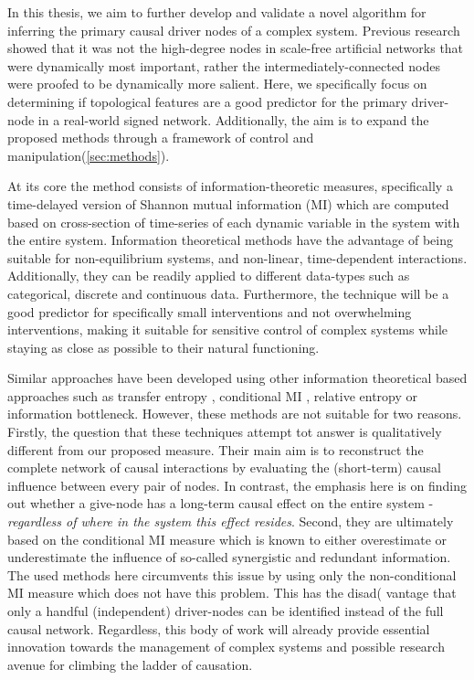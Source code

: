 \documentclass[twoside, twocolumn]{article}
\begin{document}
	In this thesis, we aim to further develop and validate a novel algorithm for inferring the primary causal driver nodes of a complex system\cite{Quax2013}. Previous research showed that it was not the high-degree nodes in scale-free artificial networks that were dynamically most important, rather the intermediately-connected nodes were proofed to be dynamically more salient. Here, we specifically focus on determining if topological features are a good predictor for the primary driver-node in a real-world signed network.  Additionally, the aim is to expand the proposed methods through a framework of control and manipulation(\ref{sec:methods}).

	At its core the method consists of information-theoretic measures, specifically a time-delayed version of Shannon mutual information (MI)\cite{Cover2005} which are computed based on cross-section of time-series of each dynamic variable in the system with the entire system. Information theoretical methods have the advantage of being suitable for non-equilibrium systems, and non-linear,  time-dependent interactions. Additionally, they can be readily applied to different data-types such as categorical, discrete and continuous data. Furthermore, the technique will be a good predictor for specifically small interventions and not overwhelming interventions, making it suitable for sensitive control of complex systems while staying as close as possible to their natural functioning.

	Similar approaches have been developed using other information theoretical based approaches such as transfer entropy \cite{Eichler2006}, conditional MI \cite{Wibral2014}, relative entropy\cite{AY2008} or information bottleneck\cite{Tishby2000}. However, these methods are not suitable for two reasons. Firstly, the  question that these techniques attempt tot answer is qualitatively different from our proposed measure. Their main aim is to reconstruct the complete network of causal interactions by evaluating the (short-term) causal influence between every pair of nodes. In contrast, the emphasis here is on finding out whether a give-node has a long-term causal effect on the entire system - \textit{regardless of where in the system this effect resides}. Second, they are ultimately based on the conditional MI measure which is known to either overestimate or underestimate the influence of so-called synergistic and redundant information\cite{James2016a}. The used methods here circumvents this issue by using only the non-conditional MI measure which does not have this problem. This has the disad\left( vantage that only a handful (independent) driver-nodes can be identified instead of the full causal network. Regardless, this body of work will already provide essential innovation towards the management of complex systems and possible research avenue for climbing the ladder of causation.
\end{document}
